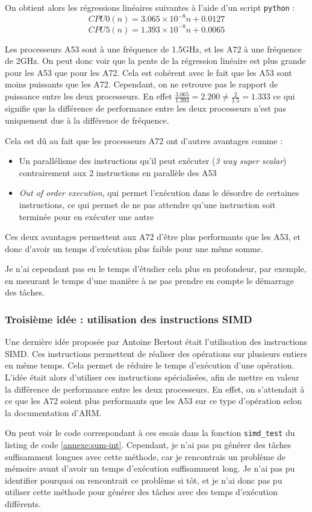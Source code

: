On obtient alors les régressions linéaires suivantes à l'aide d'un script \texttt{python} :
\[
    CPU0(n) =  3.065 \times 10^{-8} n +  0.0127 
\] 
\[
    CPU5(n) =  1.393 \times 10^{-8} n +  0.0065
\]

Les processeurs A53 sont à une fréquence de 1.5GHz, et les A72 à une fréquence de 2GHz. On peut donc voir que la pente de la régression linéaire est plus grande pour les A53 que pour les A72. Cela est cohérent avec le fait que les A53 sont moins puissants que les A72. Cependant, on ne retrouve pas le rapport de puissance entre les deux processeurs. En effet $\frac{3.065}{1.393} = 2.200 \neq \frac{2}{1.5} = 1.333$ ce qui signifie que la différence de performance entre les deux processeurs n'est pas uniquement due à la différence de fréquence.


Cela est dû au fait que les processeurs A72 ont d'autres avantages comme :
\begin{itemize}
    \item Un parallélisme des instructions qu'il peut exécuter (\textit{3 way super scalar}) contrairement aux 2 instructions en parallèle des A53
    \item \textit{Out of order execution}, qui permet l’exécution dans le désordre de certaines instructions, ce qui permet de ne pas attendre qu'une instruction soit terminée pour en exécuter une autre
\end{itemize}

Ces deux avantages permettent aux A72 d'être plus performants que les A53, et donc d'avoir un temps d'exécution plus faible pour une même somme.

Je n'ai cependant pas eu le temps d'étudier cela plus en profondeur, par exemple, en mesurant le temps d'une manière à ne pas prendre en compte le démarrage des tâches. 


\subsubsection{Troisième idée : utilisation des instructions SIMD}

Une dernière idée proposée par Antoine Bertout était l'utilisation des instructions SIMD. Ces instructions permettent de réaliser des opérations sur plusieurs entiers en même temps. Cela permet de réduire le temps d'exécution d'une opération. L'idée était alors d'utiliser ces instructions spécialisées, afin de mettre en valeur la différence de performance entre les deux processeurs. En effet, on s'attendait à ce que les A72 soient plus performants que les A53 sur ce type d'opération selon la documentation d'ARM.

On peut voir le code correspondant à ces essais dans la fonction \texttt{simd\_test} du listing de code \ref{annexe:sum-int}. Cependant, je n'ai pas pu générer des tâches suffisamment longues avec cette méthode, car je rencontrais un problème de mémoire avant d'avoir un temps d’exécution suffisamment long. Je n'ai pas pu identifier pourquoi on rencontrait ce problème si tôt, et je n'ai donc pas pu utiliser cette méthode pour générer des tâches avec des temps d'exécution différents.